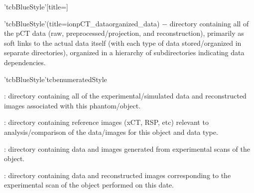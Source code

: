 \begin{tcbfunctionenv}'tcbBlueStyle'[title=]%
\begin{tcbparagraph}'tcbBlueStyle'(title=\dirsep ion\dirsep pCT\_data\dirsep organized\_data)%
$\boldsymbol{-}$ directory containing all of the pCT data (raw, preprocessed/projection, and reconstruction), primarily as soft links to the actual data itself (with each type of data stored/organized in separate directories), organized in a hierarchy of subdirectories indicating data dependencies.
\end{tcbparagraph}
\begin{tcbparagraph}'tcbBlueStyle'{tcbenumeratedStyle}
    \begin{deepList}[labelindent=1pt, leftmargin=*]
        \item {} : directory containing all of the experimental/simulated data and reconstructed images associated with this phantom/object.
        \begin{deepList}[labelindent=1pt, leftmargin=*]
            \item {} : directory containing reference images (xCT, RSP, etc) relevant to analysis/comparison of the data/images for this object and data type.
            \item {} : directory containing data and images generated from experimental scans of the object.
            \begin{deepList}[labelindent=1pt, leftmargin=*]
                \item {} : directory containing data and reconstructed images corresponding to the experimental scan of the object performed on this date.

\end{deepList}
\end{deepList}
\end{deepList}
\end{tcbparagraph}
\end{tcbfunctionenv}
